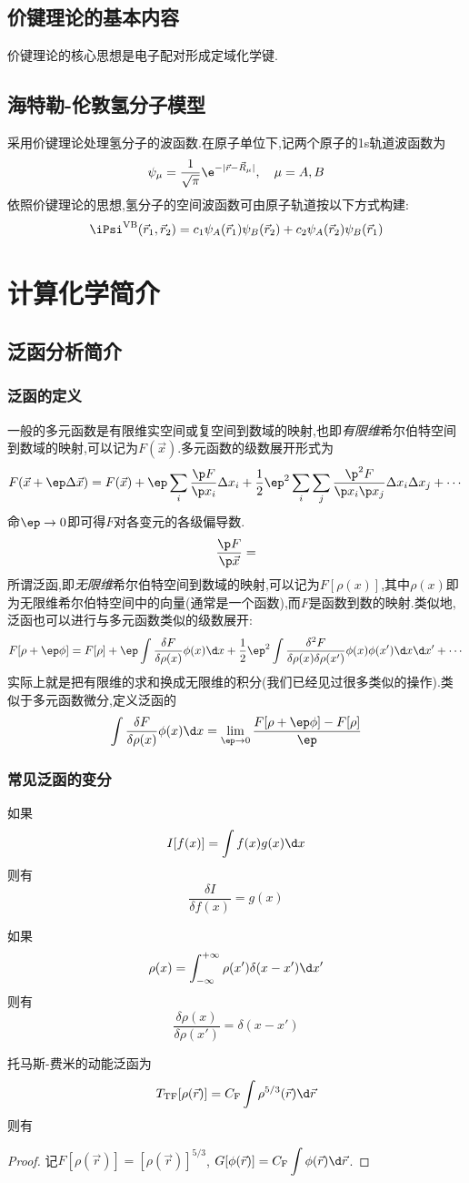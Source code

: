 \documentclass{ctexbook}
\begin{document}
\subsection{价键理论的基本内容}
价键理论的核心思想是电子配对形成定域化学键.
\subsection{海特勒-伦敦氢分子模型}
采用价键理论处理氢分子的波函数.在原子单位下,记两个原子的1s轨道波函数为
\[\psi_\mu=\dfrac{1}{\sqrt\pi}\e^{-|\vec{r}-\vec{R}_\mu|},\quad\mu=A,B\]
依照价键理论的思想,氢分子的空间波函数可由原子轨道按以下方式构建:
\[\iPsi^{\text{VB}}(\vec{r}_1,\vec{r}_2)=c_1\psi_A(\vec{r}_1)\psi_B(\vec{r}_2)+c_2\psi_A(\vec{r}_2)\psi_B(\vec{r}_1)\]
\section{计算化学简介}
\subsection{泛函分析简介}
\subsubsection{泛函的定义}
一般的多元函数是有限维实空间或复空间到数域的映射,也即\textit{有限维}希尔伯特空间到数域的映射,可以记为$F(\vec{x})$.多元函数的级数展开形式为
\[F(\vec{x}+\ep\Delta\vec{x})=F(\vec{x})+\ep\sum_{i}\dfrac{\p F}{\p x_i}\Delta x_i+\dfrac12\ep^2\sum_{i}\sum_{j}\dfrac{\p^2 F}{\p x_i\p x_j}\Delta x_i\Delta x_j+\cdots\]
命$\ep\to0$即可得$F$对各变元的各级偏导数.
\[\dfrac{\p F}{\p\vec{x}}=\]
\indent 所谓泛函,即\textit{无限维}希尔伯特空间到数域的映射,可以记为$F[\rho(x)]$,其中$\rho(x)$即为无限维希尔伯特空间中的向量(通常是一个函数),而$F$是函数到数的映射.类似地,泛函也可以进行与多元函数类似的级数展开:
\[F[\rho+\ep\phi]=F[\rho]+\ep\int\dfrac{\delta F}{\delta\rho(x)}\phi(x)\d x+\dfrac12\ep^2\int\dfrac{\delta^2 F}{\delta\rho(x)\delta\rho(x')}\phi(x)\phi(x')\d x\d x'+\cdots\]
实际上就是把有限维的求和换成无限维的积分(我们已经见过很多类似的操作).类似于多元函数微分,定义泛函的
\[\int\dfrac{\delta F}{\delta\rho(x)}\phi(x)\d x=\lim_{\ep\to0}\dfrac{F[\rho+\ep\phi]-F[\rho]}{\ep}\]
\subsubsection{常见泛函的变分}
\begin{lemma}
    如果
    \[I[f(x)]=\displaystyle\int f(x)g(x)\d x\]
    则有
    \[\dfrac{\delta I}{\delta f(x)}=g(x)\]
\end{lemma}
\begin{lemma}
    如果
    \[\rho(x)=\int_{-\infty}^{+\infty}\rho(x')\delta(x-x')\d x'\]
    则有
    \[\dfrac{\delta\rho(x)}{\delta\rho(x')}=\delta(x-x')\]
\end{lemma}
\begin{problem}
    托马斯-费米的动能泛函为
    \[T_{\text{TF}}[\rho(\vec{r})]=C_\text{F}\int\rho^{5/3}(\vec{r})\d\vec{r}\]
    则有
\end{problem}
\begin{proof}
    记$F[\rho(\vec{r})]=[\rho(\vec{r})]^{5/3}$, $G[\phi(\vec{r})]=C_\text{F}\displaystyle\int\phi(\vec{r})\d\vec{r}$.
\end{proof}
\end{document}

